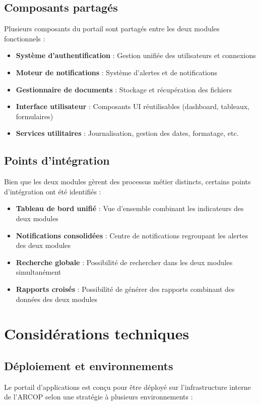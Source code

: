 \subsection{Composants partagés}
Plusieurs composants du portail sont partagés entre les deux modules fonctionnels :

\begin{itemize}
    \item \textbf{Système d'authentification} : Gestion unifiée des utilisateurs et connexions
    \item \textbf{Moteur de notifications} : Système d'alertes et de notifications
    \item \textbf{Gestionnaire de documents} : Stockage et récupération des fichiers
    \item \textbf{Interface utilisateur} : Composants UI réutilisables (dashboard, tableaux, formulaires)
    \item \textbf{Services utilitaires} : Journalisation, gestion des dates, formatage, etc.
\end{itemize}

\subsection{Points d'intégration}
Bien que les deux modules gèrent des processus métier distincts, certains points d'intégration ont été identifiés :

\begin{itemize}
    \item \textbf{Tableau de bord unifié} : Vue d'ensemble combinant les indicateurs des deux modules
    \item \textbf{Notifications consolidées} : Centre de notifications regroupant les alertes des deux modules
    \item \textbf{Recherche globale} : Possibilité de rechercher dans les deux modules simultanément
    \item \textbf{Rapports croisés} : Possibilité de générer des rapports combinant des données des deux modules
\end{itemize}

\section{Considérations techniques}

\subsection{Déploiement et environnements}
Le portail d'applications est conçu pour être déployé sur l'infrastructure interne de l'ARCOP selon une stratégie à plusieurs environnements :

